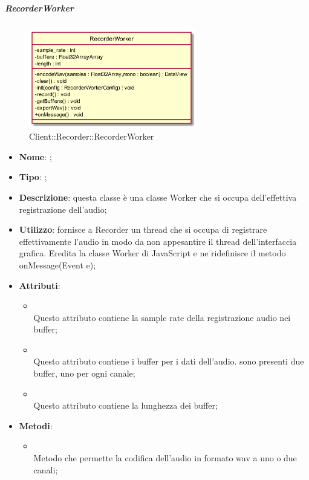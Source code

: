 \hypertarget{RecorderWorker_label}{\subparagraph{RecorderWorker}}
\begin{figure}[h]
	\centering
	\includegraphics[width=0.65\textwidth,height=\textheight,keepaspectratio]{images/ClassRecorderWorker.png}
	\caption{Client::Recorder::RecorderWorker}
\end{figure}
\begin{itemize}
	\item \textbf{Nome}: ;
	\item \textbf{Tipo}: ;
	\item \textbf{Descrizione}: questa classe è una classe Worker che si occupa dell'effettiva registrazione dell'audio;
	\item \textbf{Utilizzo}: fornisce a Recorder un thread che si occupa di registrare effettivamente l'audio in modo da non appesantire il thread dell'interfaccia grafica.
	Eredita la classe Worker di JavaScript e ne ridefinisce il metodo onMessage(Event e);
	\item \textbf{Attributi}:
	\begin{itemize}
		\item[]  \\
		Questo attributo contiene la sample rate della registrazione audio nei buffer;
		\item[]  \\
		Questo attributo contiene i buffer per i dati dell'audio. sono presenti due buffer, uno per ogni canale;
		\item[]  \\
		Questo attributo contiene la lunghezza dei buffer;
	\end{itemize}
	\item \textbf{Metodi}:
	\begin{itemize}
		\item[]  \\		Metodo che permette la codifica dell'audio in formato wav a uno o due canali;\\

\end{itemize}
\end{itemize}
